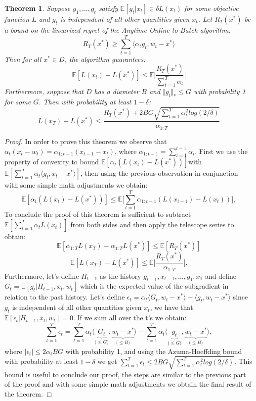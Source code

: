 \documentclass[12pt]{article}
\newtheorem{theorem}{Theorem}
\theoremstyle{definition}
\begin{document}
\begin{theorem}
Suppose $g_1, \dots, g_t$ satisfy $\mathbb{E}[g_t|x_t] \in \delta L(x_t)$ for some objective function $L$ and $g_t$ is independent of all other quantities given $x_t$. Let $R_T(x^*)$ be a bound on the linearized regret of the Anytime Online to Batch algorithm. 
$$
R_T(x^*) \geqslant \sum_{t=1}^T \langle \alpha_t g_t, w_t - x^* \rangle 
$$
Then for all $x^* \in D$, the algorithm guarantees:
$$
\mathbb{E}[L(x_t)-L(x^*)] \leq \mathbb{E}\bigg[\frac{R_T(x^*)}{\sum_{t=1}^T \alpha_t}\bigg]
$$
Furthermore, suppose that $D$ has a diameter $B$ and $\Vert g_t \Vert_{*} \leq G$ with probability 1 for some $G$. Then with probability at least $1-\delta$:
$$
L(x_T)-L(x^*) \leq \frac{R_T(x^*)+2BG \sqrt{\sum_{t=1}^T \alpha_t^2 log(2/\delta)}}{\alpha_{1:T}}
$$
\label{Ashokproof-1}
\end{theorem}

\begin{proof}
In order to prove this theorem we observe that $\alpha_t(x_t-w_t) = \alpha_{1:t-1}(x_{t-1}-x_t)$, where $\alpha_{1:t-1} = \sum_{i=1}^{t-1} \alpha_i$. First we use the property of convexity to bound $\mathbb{E}[\alpha_t (L(x_t)-L(x^*))]$with $\mathbb{E}[\sum_{t=1}^T \alpha_t \langle g_t,x_t - x^* \rangle ]$, then using the previous observation in conjunction with some simple math adjustments we obtain:
$$
\mathbb{E}[\alpha_t(L(x_t)-L(x^*))] \leq \mathbb{E}\bigg[\sum_{t=1}^T \alpha_{1:t-1} (L(x_{t-1})-L(x_t)) \bigg],
$$
To conclude the proof of this theorem is sufficient to subtract $\mathbb{E}[\sum_{t=1}^T \alpha_t L(x_t)]$ from both sides and then apply the telescope series to obtain:
$$
\mathbb{E}[\alpha_{1:T} L(x_T)-\alpha_{1:T} L(x^*)] \leq \mathbb{E}[R_T(x^*)]
$$
$$
\mathbb{E}[L(x_T)-L(x^*)] \leq \mathbb{E}\bigg[\frac{R_T(x^*)}{\alpha_{1:T}}\bigg].
$$
Furthermore, let's define $H_{t-1}$ as the history $g_{t-1},x_{t-1},\dots,g_1,x_1$ and define $G_t = \mathbb{E}[g_t | H_{t-1},x_t,w_t]$ which is the expected value of the subgradient in relation to the past history. Let's define $\epsilon_t = \alpha_t \langle G_t, w_t - x^* \rangle - \langle g_t, w_t - x^* \rangle$ since $g_t$ is independent of all other quantities given $x_t$, we have that $\mathbb{E}[\epsilon_t | H_{t-1},x_t,w_t]=0$. If we sum all over the t's we obtain:
$$
\sum_{t=1}^T \epsilon_t = \sum_{t=1}^T  \alpha_t \langle \underbrace{G_t}_\text{($\leq G$)},\underbrace{w_t-x^*}_\text{($\leq B$)} \rangle - \sum_{t=1}^T  \alpha_t \langle \underbrace{g_t}_\text{($\leq G$)},\underbrace{w_t-x^*}_\text{($\leq B$)} \rangle,
$$
where $ |\epsilon_t| \leq 2\alpha_t BG$ with probability 1, and using the Azuma-Hoeffding bound with probability at least $1-\delta$ we get $\sum_{t=1}^T \epsilon_t \leq 2BG \sqrt{\sum_{t=1}^T \alpha_t^2 log(2/\delta)} $. This bound is useful to conclude our proof, the steps are similar to the previous part of the proof and with some simple math adjustments we obtain the final result of the theorem.  
\end{proof}


 

\end{document}
